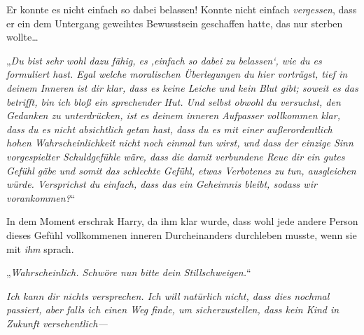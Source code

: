 Er konnte es nicht einfach so dabei belassen! Konnte nicht einfach \emph{vergessen}, dass er ein dem Untergang geweihtes Bewusstsein geschaffen hatte, das nur sterben wollte…

„\emph{Du bist sehr wohl dazu fähig, es ‚einfach so dabei zu belassen‘, wie du es formuliert hast. Egal welche moralischen Überlegungen du hier vorträgst, tief in deinem Inneren ist dir klar, dass es keine Leiche und kein Blut gibt; soweit es das betrifft, bin ich bloß ein sprechender Hut. Und selbst obwohl du versuchst, den Gedanken zu unterdrücken, ist es deinem inneren Aufpasser vollkommen klar, dass du es nicht absichtlich getan hast, dass du es mit einer außerordentlich hohen Wahrscheinlichkeit nicht noch einmal tun wirst, und dass der einzige Sinn vorgespielter Schuldgefühle wäre, dass die damit verbundene Reue dir ein gutes Gefühl gäbe und somit das schlechte Gefühl, etwas Verbotenes zu tun, ausgleichen würde. Versprichst du einfach, dass das ein Geheimnis bleibt, sodass wir vorankommen?}“

In dem Moment erschrak Harry, da ihm klar wurde, dass wohl jede andere Person dieses Gefühl vollkommenen inneren Durcheinanders durchleben musste, wenn sie mit \emph{ihm} sprach.

„\emph{Wahrscheinlich. Schwöre nun bitte dein Stillschweigen.}“

\emph{Ich kann dir nichts versprechen. Ich will natürlich nicht, dass dies nochmal passiert, aber falls ich einen Weg finde, um sicherzustellen, dass kein Kind in Zukunft versehentlich—}

